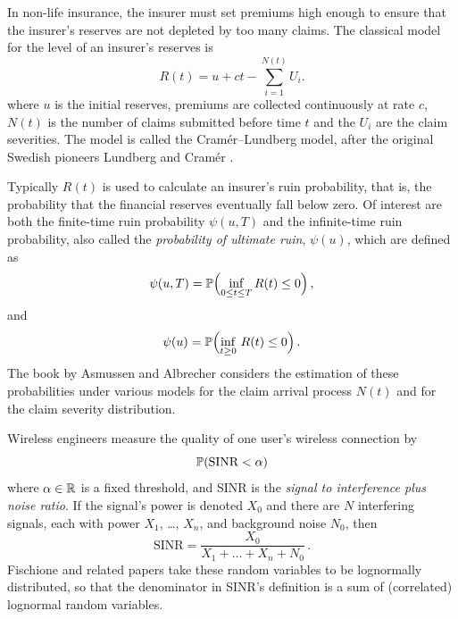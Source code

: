 \begin{example}

In non-life insurance, the insurer must set premiums high enough to ensure that the insurer's reserves are not depleted by too many claims. The classical model for the level of an insurer's reserves is
\begin{equation*}
R(t)=u+ct-\sum_{i=1}^{N(t)}U_i.
\end{equation*}
where $u$ is the initial reserves, premiums are collected continuously at rate $c$, $N(t)$ is the number of claims submitted before time $t$ and the $U_i$ are the claim severities. The model is called the Cram{\'e}r--Lundberg model, after the original Swedish pioneers Lundberg \cite{lundberg1903approximerad} and Cram{\'e}r \cite{cramer1930mathematical}.

Typically $R(t)$ is used to calculate an insurer's ruin probability, that is, the probability that the financial reserves eventually fall below zero. Of interest are both the finite-time ruin probability $\psi(u,T)$ and the infinite-time ruin probability, also called the \emph{probability of ultimate ruin}, $\psi(u)$, which are defined as
\begin{equation*}
\psi(u,T)=\operatorname{{\mathbb P}}\Bigl( \inf_{0 \le t \le T} R(t) \leq 0 \Bigr)\,,
\end{equation*}
and
\begin{equation*}
\psi(u)=\operatorname{{\mathbb P}}\Bigl( \inf_{t \geq 0}\,R(t) \leq 0 \Bigr)\,.
\end{equation*}
The book by Asmussen and Albrecher \cite{asmussen2010ruin} considers the estimation of these probabilities under various models for the claim arrival process $N(t)$ and for the claim severity distribution.
\remQED
\end{example}

\begin{example}
Wireless engineers measure the quality of one user's wireless connection by
\[ \operatorname{{\mathbb P}}( \text{SINR} < \alpha ) \]
where $\alpha \in \mathbb{R}$ is a fixed threshold, and SINR is the \emph{signal to interference plus noise ratio}. If the signal's power is denoted $X_0$ and there are $N$ interfering signals, each with power $X_1$, \dots, $X_n$, and background noise $N_0$, then
\[ \text{SINR} = \frac{X_0}{X_1 + \dots + X_n + N_0} \,. \]
Fischione \cite{fischione2007approximation} and related papers take these random variables to be lognormally distributed, so that the denominator in SINR's definition is a sum of (correlated) lognormal random variables.
\remQED
\end{example}

